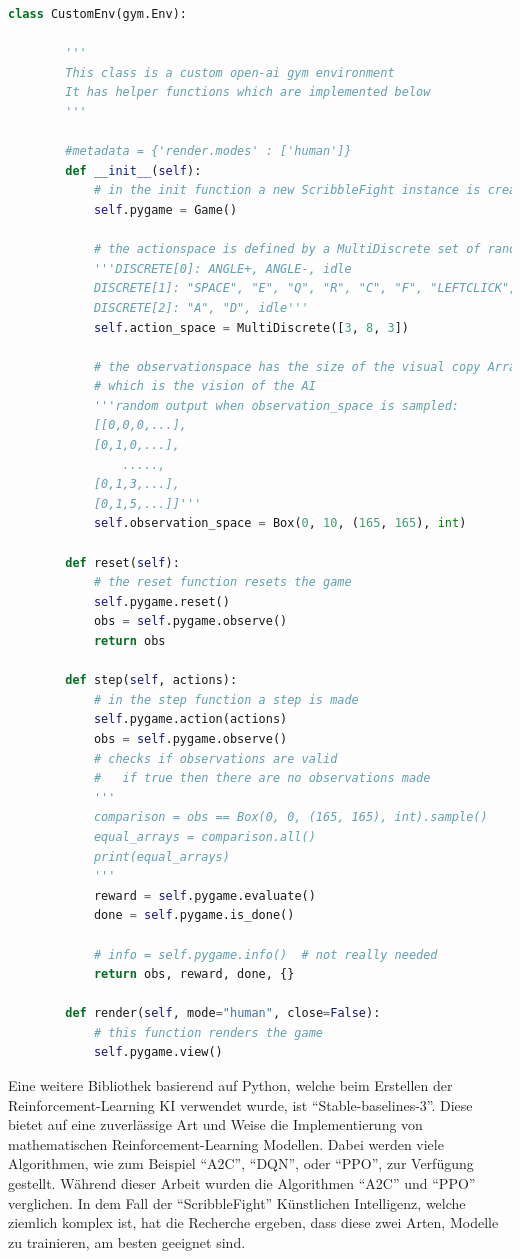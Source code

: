 \begin{lstlisting}[language=Python,firstnumber=5]
    class CustomEnv(gym.Env):

        '''
        This class is a custom open-ai gym environment
        It has helper functions which are implemented below
        '''

        #metadata = {'render.modes' : ['human']}
        def __init__(self):
            # in the init function a new ScribbleFight instance is created
            self.pygame = Game()
            
            # the actionspace is defined by a MultiDiscrete set of random numbers
            '''DISCRETE[0]: ANGLE+, ANGLE-, idle
            DISCRETE[1]: "SPACE", "E", "Q", "R", "C", "F", "LEFTCLICK", idle
            DISCRETE[2]: "A", "D", idle'''
            self.action_space = MultiDiscrete([3, 8, 3])

            # the observationspace has the size of the visual copy Array (165x165), 
            # which is the vision of the AI
            '''random output when observation_space is sampled:
            [[0,0,0,...],
            [0,1,0,...],
                .....,
            [0,1,3,...],
            [0,1,5,...]]'''
            self.observation_space = Box(0, 10, (165, 165), int)

        def reset(self):
            # the reset function resets the game
            self.pygame.reset()
            obs = self.pygame.observe()
            return obs

        def step(self, actions):
            # in the step function a step is made
            self.pygame.action(actions)
            obs = self.pygame.observe()
            # checks if observations are valid
            #   if true then there are no observations made
            ''' 
            comparison = obs == Box(0, 0, (165, 165), int).sample()
            equal_arrays = comparison.all()
            print(equal_arrays)
            '''
            reward = self.pygame.evaluate()
            done = self.pygame.is_done()

            # info = self.pygame.info()  # not really needed
            return obs, reward, done, {}

        def render(self, mode="human", close=False):
            # this function renders the game
            self.pygame.view()

\end{lstlisting}


Eine weitere Bibliothek basierend auf Python, welche beim Erstellen der Reinforcement-Learning KI verwendet wurde, ist ``Stable-baselines-3''. Diese bietet auf eine zuverlässige Art und Weise die Implementierung von mathematischen Reinforcement-Learning Modellen. Dabei werden viele Algorithmen, wie zum Beispiel ``A2C'', ``DQN'', oder ``PPO'', zur Verfügung gestellt. Während dieser Arbeit wurden die Algorithmen ``A2C'' und ``PPO'' verglichen. In dem Fall der ``ScribbleFight'' Künstlichen Intelligenz, welche ziemlich komplex ist, hat die Recherche ergeben, dass diese zwei Arten, Modelle zu trainieren, am besten geeignet sind.

